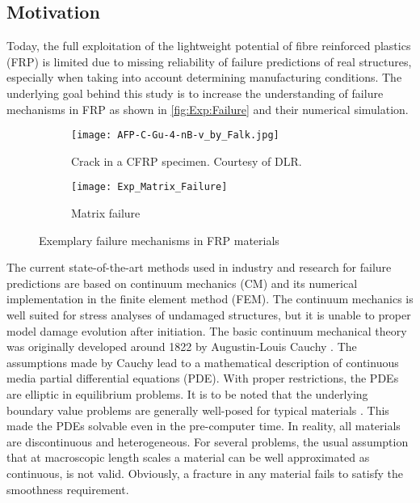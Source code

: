 \subsection{Motivation} 

Today, the full exploitation of the lightweight potential of fibre reinforced plastics (FRP) is limited due to missing reliability of failure predictions of real structures, especially when taking into account determining manufacturing conditions. The underlying goal behind this study is to increase the understanding of failure mechanisms in FRP as shown in \autoref{fig:Exp:Failure} and their numerical simulation.

\begin{figure}[htbp]
  \begin{subfigure}{0.59\linewidth}
    \centering
    \texttt{[image: AFP-C-Gu-4-nB-v\_by\_Falk.jpg]}
    \caption{Crack in a CFRP specimen. Courtesy of DLR.}
    \label{fig:Exp:CompositeCrack}
  \end{subfigure}%
  \hfill
  \begin{subfigure}{0.39\linewidth}
    \centering
    \texttt{[image: Exp\_Matrix\_Failure]}
    \caption{Matrix failure \cite{GamstedtEK1999,KrauseD2016}}
    \label{fig:Exp:MatrixFailure}
  \end{subfigure}%
  \caption{Exemplary failure mechanisms in FRP materials}
  \label{fig:Exp:Failure}
\end{figure}

The current state-of-the-art methods used in industry and research for failure predictions are based on continuum mechanics (CM) and its numerical implementation in the finite element method (FEM). The continuum mechanics is well suited for stress analyses of undamaged structures, but it is unable to proper model damage evolution after initiation. The basic continuum mechanical theory was originally developed around 1822 by Augustin-Louis Cauchy  \cite{BobaruF2017}. The assumptions made by Cauchy lead to a mathematical description of continuous media partial differential equations (PDE). With proper restrictions, the PDEs are elliptic in equilibrium problems. It is to be noted that the underlying boundary value problems are generally well-posed for typical materials \cite{BobaruF2017}. This  made the PDEs solvable even in the pre-computer time. In reality, all materials are discontinuous and heterogeneous. For several problems, the usual assumption that at macroscopic length scales a material can be well approximated as continuous, is not valid. Obviously, a fracture in any material fails to satisfy the smoothness requirement.

